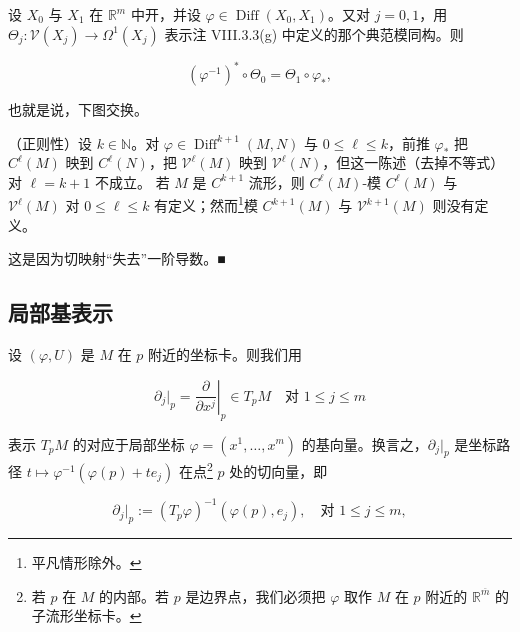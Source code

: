 \begin{remark}
\begin{items}
设 $ X_{0} $ 与 $ X_{1} $ 在 $ \mathbb{R}^{m} $ 中开，并设 $ \varphi \in \operatorname{Diff}(X_{0},X_{1}) $。又对 $ j = 0,1 $，用 $ \Theta_{j} : \mathcal{V}(X_{j}) \to \Omega^{1}(X_{j}) $ 表示注 VIII.3.3(g) 中定义的那个典范模同构。则

\[
(\varphi^{-1})^{*} \circ \Theta_{0} = \Theta_{1} \circ \varphi_{*} ,
\]

也就是说，下图交换。

\end{items}


\begin{items}
\item[（d）]

（正则性）设 $ k \in \mathbb{N} $。对 $ \varphi \in \operatorname{Diff}^{k+1}(M,N) $ 与 $ 0 \le \ell \le k $，前推 $ \varphi_{*} $ 把 $ C^{\ell}(M) $ 映到 $ C^{\ell}(N) $，把 $ \mathcal{V}^{\ell}(M) $ 映到 $ \mathcal{V}^{\ell}(N) $，但这一陈述（去掉不等式）对 $ \ell = k+1 $ 不成立。
若 $ M $ 是 $ C^{k+1} $ 流形，则 $ C^{\ell}(M) $-模 $ C^{\ell}(M) $ 与 $ \mathcal{V}^{\ell}(M) $ 对 $ 0 \le \ell \le k $ 有定义；然而\footnote{平凡情形除外。}模 $ C^{k+1}(M) $ 与 $ \mathcal{V}^{k+1}(M) $ 则没有定义。

\proofhead
这是因为切映射“失去”一阶导数。\nobreak\hspace{0.35em}■
\end{items}

\end{remark}

\subsection*{局部基表示}

设 $ (\varphi,U) $ 是 $ M $ 在 $ p $ 附近的坐标卡。则我们用

\[
\partial_{j}|_{p} = \left.\frac{\partial}{\partial x^{j}}\right|_{p} \in T_{p}M \quad \text{对 } 1 \le j \le m
\]

表示 $ T_{p}M $ 的对应于局部坐标 $ \varphi = (x^{1},\ldots,x^{m}) $ 的基向量。换言之，$ \partial_{j}|_{p} $ 是坐标路径 $ t \mapsto \varphi^{-1}(\varphi(p) + te_{j}) $ 在点\footnote{若 $ p $ 在 $ M $ 的内部。若 $ p $ 是边界点，我们必须把 $ \varphi $ 取作 $ M $ 在 $ p $ 附近的 $ \mathbb{R}^{\overline{m}} $ 的子流形坐标卡。} $ p $ 处的切向量，即

\begin{equation}
\partial_{j}|_{p} := (T_{p}\varphi)^{-1}(\varphi(p), e_{j}) , \quad \text{对 } 1 \le j \le m ,\tag{4.2}
\end{equation}

